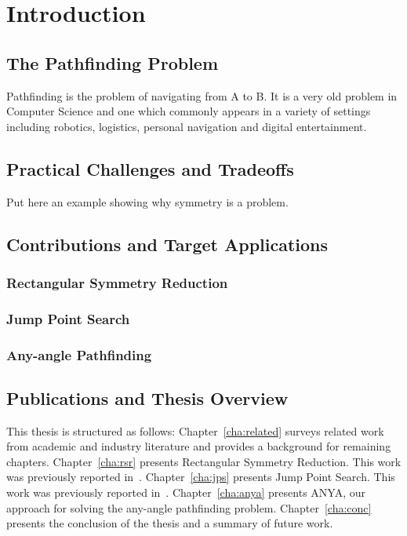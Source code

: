 \chapter{Introduction}
\label{cha:intro}

\section{The Pathfinding Problem}
Pathfinding is the problem of navigating from A to B. It is a very old
problem in Computer Science and one which commonly appears in a variety
of settings including robotics, logistics, personal navigation and 
digital entertainment.

\section{Practical Challenges and Tradeoffs}
Put here an example showing why symmetry is a problem.

\section{Contributions and Target Applications}
\subsection{Rectangular Symmetry Reduction}
\subsection{Jump Point Search}
\subsection{Any-angle Pathfinding}

\section{Publications and Thesis Overview}
\label{sec:outline}
This thesis is structured as follows: Chapter~\ref{cha:related}
surveys related work from academic and industry literature and provides 
a background for remaining chapters.
Chapter~\ref{cha:rsr}
presents Rectangular Symmetry Reduction. This work was
previously reported in~\cite{harabor10,harabor11a}.
Chapter~\ref{cha:jps} presents Jump Point Search. This work was
previously reported in~\cite{harabor11b,harabor12}.
Chapter~\ref{cha:anya} presents ANYA, our approach for solving
the any-angle pathfinding problem.
Chapter~\ref{cha:conc} presents the conclusion of the thesis
and a summary of future work.

